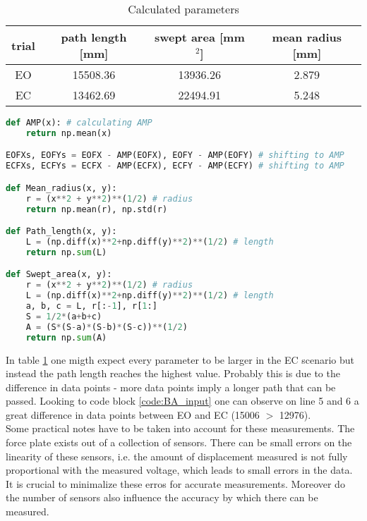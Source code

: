 \documentclass[english, a4paper, 11pt]{article}
\begin{document}
    \begin{table}[!h]
        \centering
        \begin{tabular}{c|c|c|c}
            trial & path length [mm] & swept area [mm$^2$] & mean radius [mm]\\ \hline
            EO & 15508.36 & 13936.26 & 2.879\\
            EC & 13462.69 & 22494.91 & 5.248
        \end{tabular}
        \caption{Calculated parameters}
        \label{tab:params}
    \end{table}

    \begin{lstlisting}[language=Python, caption=calculating the parameters]
def AMP(x): # calculating AMP
    return np.mean(x)

EOFXs, EOFYs = EOFX - AMP(EOFX), EOFY - AMP(EOFY) # shifting to AMP
ECFXs, ECFYs = ECFX - AMP(ECFX), ECFY - AMP(ECFY) # shifting to AMP

def Mean_radius(x, y):
    r = (x**2 + y**2)**(1/2) # radius
    return np.mean(r), np.std(r)

def Path_length(x, y):
    L = (np.diff(x)**2+np.diff(y)**2)**(1/2) # length
    return np.sum(L)

def Swept_area(x, y):
    r = (x**2 + y**2)**(1/2) # radius
    L = (np.diff(x)**2+np.diff(y)**2)**(1/2) # length
    a, b, c = L, r[:-1], r[1:]
    S = 1/2*(a+b+c)
    A = (S*(S-a)*(S-b)*(S-c))**(1/2)
    return np.sum(A)
    \end{lstlisting}

In table \ref*{tab:params} one migth expect every parameter to be larger in the EC scenario but instead the path length
reaches the highest value. Probably this is due to the difference in data points - more data points imply a longer path that can be passed.
Looking to code block \ref*{code:BA_input} one can observe on line 5 and 6 a great difference in data points between EO and EC (15006 $>$ 12976).\\

Some practical notes have to be taken into account for these measurements. The force plate
exists out of a collection of sensors. There can be small errors on the linearity of these 
sensors, i.e. the amount of displacement measured is not fully proportional with the measured voltage, which
leads to small errors in the data. It is crucial to minimalize these erros for accurate measurements.
Moreover do the number of sensors also influence the accuracy by which there can be measured.
\end{document}
